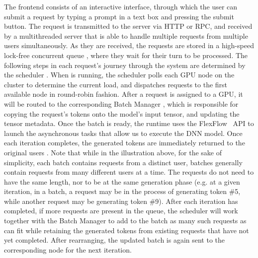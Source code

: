 The \Project frontend consists of an interactive interface, through which the user can submit a request  by typing a prompt in a text box and pressing the submit button. The request is transmitted to the \Project server via HTTP or RPC, and received by a multithreaded server that is able to handle multiple requests from multiple users simultaneously. As they are received, the requests are stored in a high-speed lock-free concurrent queue , where they wait for their turn to be processed. The following steps in each request's journey through the \Project system are determined by the scheduler . When \Project is running, the scheduler polls each GPU node on the cluster to determine the current load, and dispatches requests to the first available node in round-robin fashion. After a request is assigned to a GPU, it will be routed to the corresponding Batch Manager , which is responsible for copying the request's tokens onto the model's input tensor, and updating the tensor metadata. Once the batch is ready, the runtime uses the FlexFlow~\cite{flexflow, unity} API to launch the asynchronous tasks  that allow us to execute the DNN model. Once each iteration completes, the generated tokens are immediately returned to the original users . Note that while in the illustration above, for the sake of simplicity, each batch contains requests from a distinct user, batches generally contain requests from many different users at a time. The requests do not need to have the same length, nor to be at the same generation phase (e.g. at a given iteration, in a batch, a request may be in the process of generating token \#5, while another request may be generating token \#9). After each iteration has completed, if more requests are present in the queue, the scheduler  will work together with the Batch Manager to add to the batch as many such requests as can fit while retaining the generated tokens from existing requests that have not yet completed. After rearranging, the updated batch is again sent to the corresponding node for the next iteration.

